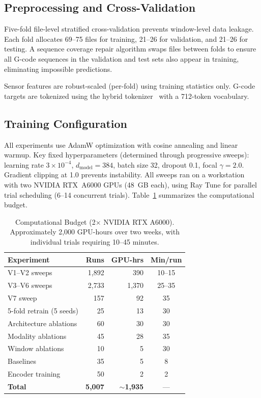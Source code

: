 \documentclass[sensors,article,submit,moreauthors,pdftex]{Definitions/mdpi}
\begin{document}
\subsection{Preprocessing and Cross-Validation}

Five-fold file-level stratified cross-validation prevents window-level data leakage. Each fold allocates 69--75 files for training, 21--26 for validation, and 21--26 for testing. A sequence coverage repair algorithm swaps files between folds to ensure all G-code sequences in the validation and test sets also appear in training, eliminating impossible predictions.

Sensor features are robust-scaled (per-fold) using training statistics only. G-code targets are tokenized using the hybrid tokenizer~\cite{grammar_paper} with a 712-token vocabulary.

\subsection{Training Configuration}

All experiments use AdamW optimization with cosine annealing and linear warmup. Key fixed hyperparameters (determined through progressive sweeps): learning rate $3 \times 10^{-4}$, $d_\text{model} = 384$, batch size 32, dropout 0.1, focal $\gamma = 2.0$. Gradient clipping at 1.0 prevents instability. All sweeps ran on a workstation with two NVIDIA RTX~A6000 GPUs (48~GB each), using Ray Tune for parallel trial scheduling (6--14 concurrent trials). Table~\ref{tab:compute} summarizes the computational budget.

\begin{table}[htbp]
\centering
\caption{Computational Budget (2$\times$ NVIDIA RTX A6000). Approximately 2{,}000 GPU-hours over two weeks, with individual trials requiring 10--45 minutes.}
\label{tab:compute}
\small
\begin{tabular}{@{}lrrc@{}}
\toprule
\textbf{Experiment} & \textbf{Runs} & \textbf{GPU-hrs} & \textbf{Min/run} \\
\midrule
V1--V2 sweeps      & 1{,}892 & 390  & 10--15 \\
V3--V6 sweeps      & 2{,}733 & 1{,}370 & 25--35 \\
V7 sweep            & 157   & 92   & 35 \\
5-fold retrain (5 seeds) & 25 & 13 & 30 \\
Architecture ablations & 60 & 30  & 30 \\
Modality ablations  & 45    & 28   & 35 \\
Window ablations    & 10    & 5    & 30 \\
Baselines           & 35    & 5    & 8 \\
Encoder training    & 50    & 2    & 2 \\
\midrule
\textbf{Total}      & \textbf{5{,}007} & $\sim$\textbf{1{,}935} & --- \\
\bottomrule
\end{tabular}
\normalsize
\end{table}
\end{document}
